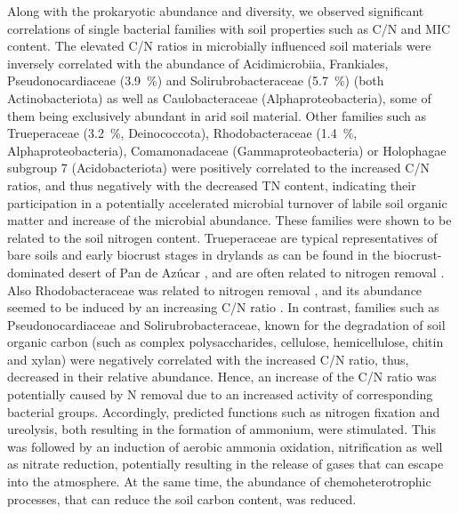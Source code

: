 Along with the prokaryotic abundance and diversity, we observed significant correlations of single bacterial families with soil properties such as C/N and MIC content. The elevated C/N ratios in microbially influenced soil materials were inversely correlated with the abundance of Acidimicrobiia, Frankiales, Pseudonocardiaceae (\SI{3.9}{\percent}) and Solirubrobacteraceae (\SI{5.7}{\percent}) (both Actinobacteriota) as well as Caulobacteraceae (Alphaproteobacteria), some of them being exclusively abundant in arid soil material. Other families such as Trueperaceae (\SI{3.2}{\percent}, Deinococcota), Rhodobacteraceae (\SI{1.4}{\percent}, Alphaproteobacteria), Comamonadaceae (Gammaproteobacteria) or Holophagae subgroup 7 (Acidobacteriota) were positively correlated to the increased C/N ratios, and thus negatively with the decreased TN content, indicating their participation in a potentially accelerated microbial turnover of labile soil organic matter and increase of the microbial abundance. These families were shown to be related to the soil nitrogen content. Trueperaceae are typical representatives of bare soils and early biocrust stages in drylands \citep{Albuquerque2005,Maier2018} as can be found in the biocrust-dominated desert of Pan de Az{\'u}car \citep{Bernhard2018}, and are often related to nitrogen removal \citep{GonzalezBlanco2020}. Also Rhodobacteraceae was related to nitrogen removal \citep{Jia2020}, and its abundance seemed to be induced by an increasing C/N ratio \citep{Guo2020}. In contrast, families such as Pseudonocardiaceae and Solirubrobacteraceae, known for the degradation of soil organic carbon (such as complex polysaccharides, cellulose, hemicellulose, chitin and xylan) \citep{Broadbent2022, Yeager2017} were negatively correlated with the increased C/N ratio, thus, decreased in their relative abundance. Hence, an increase of the C/N ratio was potentially caused by N removal due to an increased activity of corresponding bacterial groups. Accordingly, predicted functions such as nitrogen fixation and ureolysis, both resulting in the formation of ammonium, were stimulated. This was followed by an induction of aerobic ammonia oxidation, nitrification as well as nitrate reduction, potentially resulting in the release of gases that can escape into the atmosphere. At the same time, the abundance of chemoheterotrophic processes, that can reduce the soil carbon content, was reduced.

